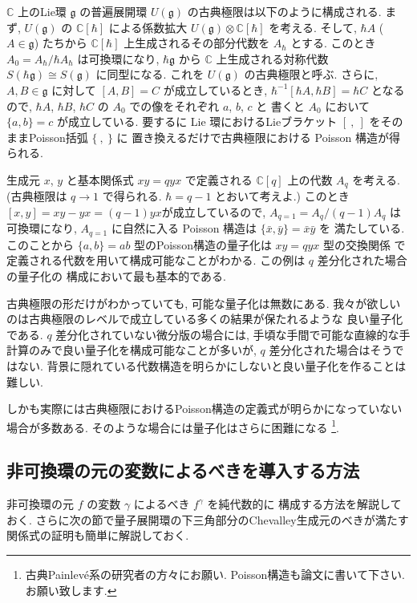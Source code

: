 \documentclass[12pt,twoside,dvipdfm]{msjproc}
\newcommand\C{{\mathbb C}} %
\theoremstyle{definition} %
\theoremstyle{definition} %
\theoremstyle{definition} %
\numberwithin{theorem}{section}
\numberwithin{equation}{section}
\numberwithin{figure}{section}
\numberwithin{table}{section}
\newcommand\g{\mathfrak{g}}
\begin{document}
$\C$ 上のLie環 $\g$ の普遍展開環 $U(\g)$ の古典極限は以下のように構成される.
まず, $U(\g)$ の $\C[\hbar]$ による係数拡大 $U(\g)\otimes\C[\hbar]$ を考える.
そして, $\hbar A$ ($A\in\g$) たちから $\C[\hbar]$ 上生成されるその部分代数を $A_\hbar$
とする.  このとき $A_0=A_\hbar/\hbar A_\hbar$ は可換環になり, 
$\hbar\g$ から $\C$ 上生成される対称代数 $S(\hbar\g)\cong S(\g)$ に同型になる.
これを $U(\g)$ の古典極限と呼ぶ.
さらに, $A,B\in\g$ に対して $[A,B]=C$ が成立しているとき, 
$\hbar^{-1}[\hbar A, \hbar B]=\hbar C$ となるので, 
$\hbar A$, $\hbar B$, $\hbar C$ の $A_0$ での像をそれぞれ $a$, $b$, $c$ と
書くと $A_0$ において $\{a,b\}=c$ が成立している.
要するに Lie 環におけるLieブラケット $[\ ,\ ]$ をそのままPoisson括弧 $\{\ ,\ \}$ に
置き換えるだけで古典極限における Poisson 構造が得られる.

生成元 $x$, $y$ と基本関係式 $xy=qyx$ で定義される $\C[q]$ 上の代数 $A_q$ を考える.
(古典極限は $q\to 1$ で得られる.  $\hbar=q-1$ とおいて考えよ.)
このとき $[x,y]=xy-yx=(q-1)yx$が成立しているので,  $A_{q=1}=A_q/(q-1)A_q$ は
可換環になり,  $A_{q=1}$ に自然に入る Poisson 構造は $\{\bar{x},\bar{y}\}=\bar{x}\bar{y}$ を
満たしている.  このことから $\{a,b\}=ab$ 型のPoisson構造の量子化は $xy=qyx$ 型の交換関係
で定義される代数を用いて構成可能なことがわかる.  この例は $q$ 差分化された場合の量子化の
構成において最も基本的である.

古典極限の形だけがわかっていても, 可能な量子化は無数にある.
我々が欲しいのは古典極限のレベルで成立している多くの結果が保たれるような
良い量子化である.
$q$ 差分化されていない微分版の場合には, 
手頃な手間で可能な直線的な手計算のみで良い量子化を構成可能なことが多いが, 
$q$ 差分化された場合はそうではない.
背景に隠れている代数構造を明らかにしないと良い量子化を作ることは難しい.

しかも実際には古典極限におけるPoisson構造の定義式が明らかになっていない場合が多数ある.
そのような場合には量子化はさらに困難になる%
\footnote{古典Painlev\'e系の研究者の方々にお願い. 
Poisson構造も論文に書いて下さい.  お願い致します.}.




\subsection{非可換環の元の変数によるべきを導入する方法}
\label{sec:powers1}

非可換環の元 $f$ の変数 $\gamma$ によるべき $f^\gamma$ を純代数的に
構成する方法を解説しておく.
さらに次の節で量子展開環の下三角部分のChevalley生成元のべきが満たす
関係式の証明も簡単に解説しておく.
\end{document}
